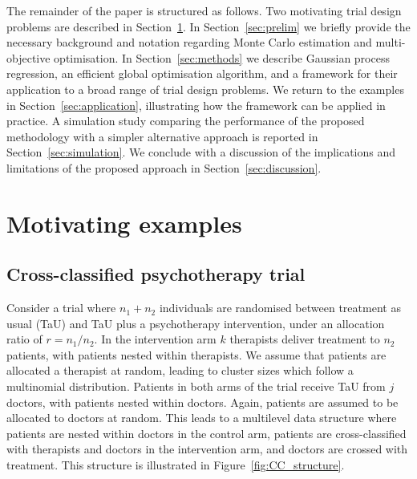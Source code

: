 \documentclass{article} %
\begin{document}
The remainder of the paper is structured as follows. Two motivating trial design problems are described in Section~\ref{sec:examples}. In Section~\ref{sec:prelim} we briefly provide the necessary background and notation regarding Monte Carlo estimation and multi-objective optimisation. In Section~\ref{sec:methods} we describe Gaussian process regression, an efficient global optimisation algorithm, and a framework for their application to a broad range of trial design problems. We return to the examples in Section~\ref{sec:application}, illustrating how the framework can be applied in practice. A simulation study comparing the performance of the proposed methodology with a simpler alternative approach is reported in Section~\ref{sec:simulation}. We conclude with a discussion of the implications and limitations of the proposed approach in Section~\ref{sec:discussion}.


\section{Motivating examples}\label{sec:examples}

\subsection{Cross-classified psychotherapy trial}\label{sec:CC}

Consider a trial where $n_{1} + n_{2}$ individuals are randomised between treatment as usual (TaU) and TaU plus a psychotherapy intervention, under an allocation ratio of $r = n_{1}/n_{2}$. In the intervention arm $k$ therapists deliver treatment to $n_{2}$ patients, with patients nested within therapists. We assume that patients are allocated a therapist at random, leading to cluster sizes which follow a multinomial distribution. Patients in both arms of the trial receive TaU from $j$ doctors, with patients nested within doctors. Again, patients are assumed to be allocated to doctors at random. This leads to a multilevel data structure where patients are nested within doctors in the control arm, patients are cross-classified with therapists and doctors in the intervention arm, and doctors are crossed with treatment. This structure is illustrated in Figure~\ref{fig:CC_structure}. 
\end{document}
